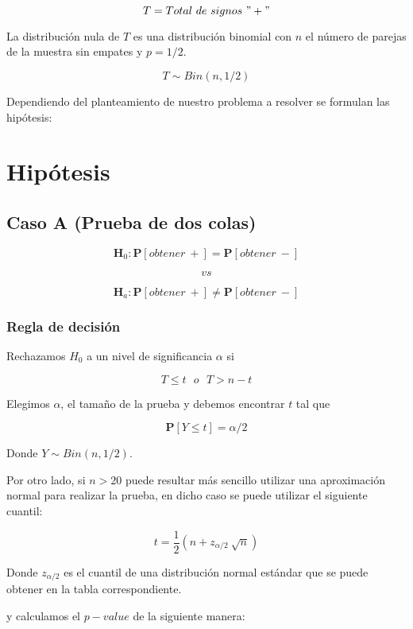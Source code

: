 \documentclass[
  a4paper,
  oneside,
  openany]{book}
\begin{document}
\[T=Total\ de\ signos\ "+"\]

La distribución nula de \(T\) es una distribución binomial con \(n\) el número de parejas de la muestra sin empates y \(p=1/2\).

\[T\sim Bin(n,1/2)\]

Dependiendo del planteamiento de nuestro problema a resolver se formulan las hipótesis:

\hypertarget{hipuxf3tesis-2}{%
\section{Hipótesis}\label{hipuxf3tesis-2}}

\hypertarget{caso-a-prueba-de-dos-colas-2}{%
\subsection*{Caso A (Prueba de dos colas)}\label{caso-a-prueba-de-dos-colas-2}}


\[\textbf{H}_0: \mathbf{P}[obtener\ +]= \mathbf{P}[obtener\ -]\]

\[vs\]

\[\textbf{H}_a: \mathbf{P}[obtener\ +] \neq \mathbf{P}[obtener\ -]\]

\hypertarget{regla-de-decisiuxf3n-6}{%
\subsubsection*{Regla de decisión}\label{regla-de-decisiuxf3n-6}}


Rechazamos \(H_0\) a un nivel de significancia \(\alpha\) si

\[T \leq t \ \ \  o \ \ \ T>n-t\]

Elegimos \(\alpha\), el tamaño de la prueba y debemos encontrar \(t\) tal que

\[\mathbf{P}[Y \leq t]=\alpha/2\]

Donde \(Y \sim Bin (n,1/2)\).

Por otro lado, si \(n>20\) puede resultar más sencillo utilizar una aproximación normal para realizar la prueba, en dicho caso se puede utilizar el siguiente cuantil:

\[t=\frac{1}{2}\left(n+z_{\alpha/2}\ \sqrt{n}\right)\]

Donde \(z_{\alpha/2}\) es el cuantil de una distribución normal estándar que se puede obtener en la tabla correspondiente.

y calculamos el \(p-value\) de la siguiente manera:
\end{document}
